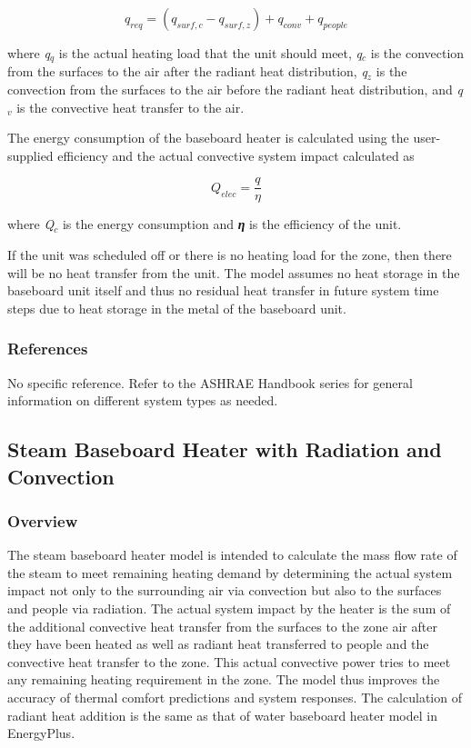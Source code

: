 \begin{equation}
{q_{req}} = ({q_{surf,c}} - {q_{surf,z}}) + {q_{conv}} + {q_{people}}
\end{equation}

where \emph{q\(_{q}\)} is the actual heating load that the unit should meet, \emph{q\(_{c}\)} is the convection from the surfaces to the air after the radiant heat distribution, \emph{q\(_{z}\)} is the convection from the surfaces to the air before the radiant heat distribution, and \emph{q\(_{v}\)} is the convective heat transfer to the air.

The energy consumption of the baseboard heater is calculated using the user-supplied efficiency and the actual convective system impact calculated as

\begin{equation}
{Q_{elec}} = \frac{q}{\eta }
\end{equation}

where \emph{Q\(_{c}\)} is the energy consumption and \textbf{\emph{η}} is the efficiency of the unit.

If the unit was scheduled off or there is no heating load for the zone, then there will be no heat transfer from the unit. The model assumes no heat storage in the baseboard unit itself and thus no residual heat transfer in future system time steps due to heat storage in the metal of the baseboard unit.

\subsubsection{References}\label{references-020}

No specific reference. Refer to the ASHRAE Handbook series for general information on different system types as needed.

\subsection{Steam Baseboard Heater with Radiation and Convection}\label{steam-baseboard-heater-with-radiation-and-convection}

\subsubsection{Overview}\label{overview-1-006}

The steam baseboard heater model is intended to calculate the mass flow rate of the steam to meet remaining heating demand by determining the actual system impact not only to the surrounding air via convection but also to the surfaces and people via radiation. The actual system impact by the heater is the sum of the additional convective heat transfer from the surfaces to the zone air after they have been heated as well as radiant heat transferred to people and the convective heat transfer to the zone. This actual convective power tries to meet any remaining heating requirement in the zone. The model thus improves the accuracy of thermal comfort predictions and system responses. The calculation of radiant heat addition is the same as that of water baseboard heater model in EnergyPlus.

